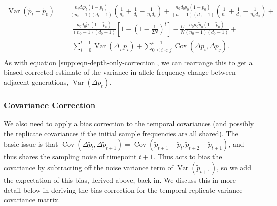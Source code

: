 \documentclass[11pt]{article}
\DeclareMathOperator{\var}{Var}
\DeclareMathOperator{\cov}{Cov}
\begin{document}
\begin{align}
  \var(\widetilde{p}_t - \widetilde{p}_0) &= 
  \frac{n_t d_t \widetilde{p}_t(1-\widetilde{p}_t)}{(n_t-1)(d_t-1)} \left(\frac{1}{n_t} + \frac{1}{d_t} - \frac{1}{n_t d_t} \right) + 
 \frac{n_0 d_0 \widetilde{p}_0(1-\widetilde{p}_0)}{(n_0-1)(d_0-1)} \left( \frac{1}{n_0} + \frac{1}{d_0} - \frac{1}{n_0 d_0}\right) + \\ & \nonumber\;\;\;\;\;\;
 \frac{n_0 d_0 \widetilde{p}_0(1-\widetilde{p}_0)}{(n_0-1)(d_0-1)}   \left[1 - \left(1-\frac{1}{2N}\right)^t \right]  - \frac{C}{N}  \frac{n_0 d_0 \widetilde{p}_0(1-\widetilde{p}_0)}{(n_0-1)(d_0-1)} + \\ \nonumber & \;\;\;\;\;\; \sum_{i=0}^{t-1} \var(\Delta_{_H} p_i)  + \sum_{0 \le i < j}^{t-1} \cov(\Delta p_i, \Delta p_j).  \\
\end{align}
%
As with equation \eqref{supp:eqn-depth-only-correction}, we can rearrange this
to get a biased-corrected estimate of the variance in allele frequency change
between adjacent generations, $\var(\Delta p_t)$. 


\subsubsection{Covariance Correction}
\label{supp:cov-corr}

We also need to apply a bias correction to the temporal covariances (and
possibly the replicate covariances if the initial sample frequencies are all
shared). The basic issue is that $\cov(\Delta \widetilde{p}_t, \Delta
\widetilde{p}_{t+1}) = \cov(\widetilde{p}_{t+1} - \widetilde{p}_t,
\widetilde{p}_{t+2} - \widetilde{p}_{t+1})$, and thus shares the sampling noise
of timepoint $t+1$. Thus acts to bias the covariance by subtracting off the
noise variance term of $\var(\widetilde{p}_{t+1})$, so we add the expectation
of this bias, derived above, back in. We discuss this in more detail below in
deriving the bias correction for the temporal-replicate variance covariance
matrix.
\end{document}
